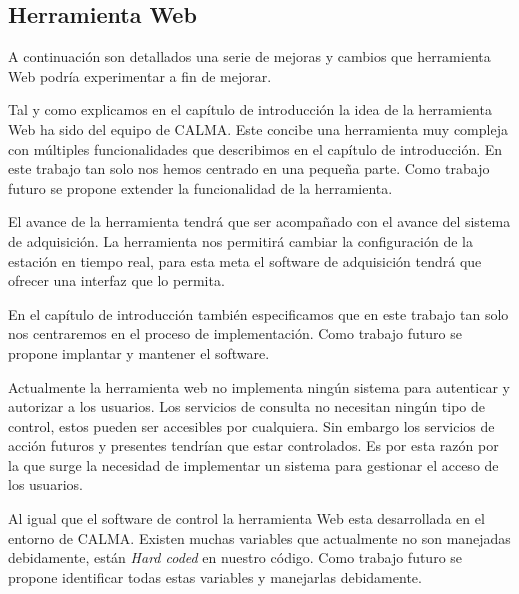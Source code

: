 	\subsection{Herramienta Web}
		A continuación son detallados una serie de mejoras y cambios que herramienta Web podría experimentar a fin de mejorar.
		\begin{description}[style=unboxed,leftmargin=0cm,labelwidth=1cm]
			\item[Extender funcionalidad]
				Tal y como explicamos en el capítulo de introducción la idea de la herramienta Web ha sido del equipo de CALMA. Este
				concibe una herramienta muy compleja con múltiples funcionalidades que describimos en el capítulo de introducción. En
				este trabajo tan solo nos hemos centrado en una pequeña parte. Como trabajo futuro se propone extender la
				funcionalidad de la herramienta.
				\par
				El avance de la herramienta tendrá que ser acompañado con el avance del sistema de adquisición. La herramienta nos
				permitirá cambiar la configuración de la estación en tiempo real, para esta meta el software de adquisición tendrá que
				ofrecer una interfaz que lo permita.
			\item[Implantación y mantenimiento]
				En el capítulo de introducción también especificamos que en este trabajo tan solo nos centraremos en el proceso de
				implementación. Como trabajo futuro se propone implantar y mantener el software.
			\item[Autenticación y autorización]
				Actualmente la herramienta web no implementa ningún sistema para autenticar y autorizar a los usuarios. Los servicios
				de consulta no necesitan ningún tipo de control, estos pueden ser accesibles por cualquiera. Sin embargo los servicios
				de acción futuros y presentes tendrían que estar controlados. Es por esta razón por la que surge la necesidad de
				implementar un sistema para gestionar el acceso de los usuarios. 
			\item[Adaptación para otras estaciones]
				Al igual que el software de control la herramienta Web esta desarrollada en el entorno de CALMA. Existen muchas
				variables que actualmente no son manejadas debidamente, están \emph{Hard coded} en nuestro código. Como trabajo futuro
				se propone identificar todas estas variables y manejarlas debidamente.
		\end{description}
